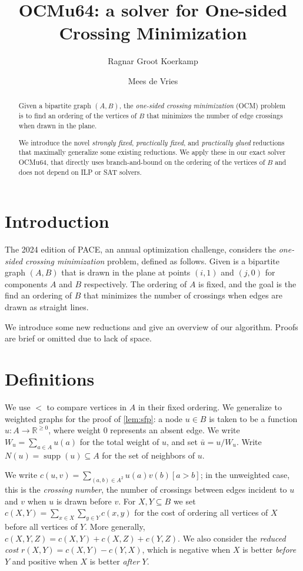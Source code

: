 \documentclass[a4paper,UKenglish,cleveref, autoref, thm-restate]{lipics-v2021}
\title{OCMu64: a solver for One-sided Crossing Minimization} %
\author{Ragnar {Groot Koerkamp}}{ETH Zurich, Switzerland}{ragnar.grootkoerkamp@gmail.com}{https://orcid.org/0000-0002-2091-1237}{}%
\author{Mees de Vries}{Unaffiliated, Netherlands}{meesdevries@protonmail.com}{}{}
\DeclareMathOperator{\supp}{supp}
\begin{document}
\maketitle

\begin{abstract}
  Given a bipartite graph $(A,B)$, the \emph{one-sided crossing minimization}
  (OCM) problem is to find an ordering of the vertices of $B$ that minimizes the
  number of edge crossings when drawn in the plane.

  We introduce the novel \emph{strongly fixed}, \emph{practically fixed}, and
  \emph{practically glued} reductions that maximally generalize some existing
  reductions.
  We apply these in our exact solver OCMu64, that directly uses branch-and-bound
  on the ordering of the vertices of $B$ and does not depend on ILP or SAT
  solvers.
\end{abstract}

\section{Introduction}

The 2024 edition of PACE, an annual optimization challenge, considers the
\emph{one-sided crossing minimization} problem, defined as follows.
Given is a bipartite graph $(A, B)$ that is drawn in the plane at points
$(i, 1)$ and $(j,0)$ for components $A$ and $B$ respectively. The ordering of $A$
is fixed, and the goal is the find an ordering of $B$ that minimizes the number of
crossings when edges are drawn as straight lines.

We introduce some new reductions and give an overview of our algorithm. Proofs are brief or
omitted due to lack of space.

\section{Definitions}
We use $<$ to compare vertices in $A$ in their fixed ordering. We generalize to weighted graphs
for the proof of \cref{lem:sfp}: a node $u \in B$ is taken to be a function $u: A \to \mathbb
R^{\geq 0}$, where weight 0 represents an absent edge. We write $W_u = \sum_{a \in A}u(a)$ for
the total weight of $u$, and set $\bar u = u/W_u$. Write $N(u) = \supp(u) \subseteq A$ for the
set of neighbors of $u$.

We write $c(u, v) = \sum_{(a, b) \in A^2}
u(a)v(b)[a > b]$; in the unweighted case, this is the \emph{crossing number}, the number of
crossings between edges incident to $u$ and $v$ when $u$ is drawn before $v$.  For
$X,Y\subseteq B$ we set $c(X,Y) = \sum_{x\in X}\sum_{y\in Y} c(x,y)$ for the cost of ordering
all vertices of $X$ before all vertices of $Y$. More generally, $c(X,Y,Z) = c(X, Y) + c(X, Z) +
c(Y, Z)$. We also consider the \emph{reduced cost} $r(X,Y) = c(X, Y) - c(Y, X)$, which is
negative when $X$ is better \emph{before} $Y$ and positive when $X$ is better \emph{after} $Y$.
\end{document}
